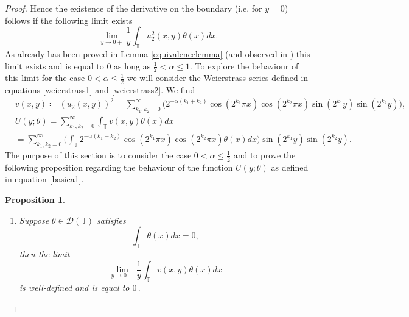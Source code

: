 \documentclass[12pt,a4paper]{article}
\newtheorem{proposition}[theorem]{Proposition}
\theoremstyle{definition}
\theoremstyle{remark}
\numberwithin{equation}{section}
\begin{document}
\begin{proof}
Hence the existence of the derivative on the boundary (i.e. for $y=0$) follows if the following limit exists
$$
\lim_{y\rightarrow 0 +} \frac1{y}  \int_{\mathbb{T}} u_2^2 (x,y) \theta (x)dx.
$$
As already has been proved in Lemma \ref{equivalencelemma} (and observed in \cite{bardos2021}) this limit exists and is equal to $0$ as long as $\frac12<\alpha \leq 1$. 
To explore the behaviour of this limit for the case $0<\alpha \le \frac12$ we will consider the Weierstrass series defined in equations \eqref{weierstrass1} and \eqref{weierstrass2}. We find
\begingroup
\allowdisplaybreaks
\begin{equation}\label{basica1}
\begin{aligned}
&v(x,y) \coloneqq (u_2(x,y))^2= \sum_{k_1, k_2=0}^\infty \bigg( 2^{-\alpha (k_1 + k_2)} \cos(2^{k_1} \pi x)  \cos(2^{k_2}\pi  x)  \sin(2^{k_1}y)  \sin(2^{k_2} y)\bigg), \\
&U(y;\theta) =  \sum_{k_1, k_2=0}^\infty \int_{\mathbb{T}} v (x,y) \theta (x)dx \\
&= \sum_{k_1, k_2=0}^\infty \bigg( \int_{\mathbb{T}} 2^{-\alpha (k_1 + k_2)} \cos(2^{k_1}  \pi x)  \cos(2^{k_2}\pi  x)\theta (x) dx\bigg)  \sin(2^{k_1}y)  \sin(2^{k_2} y) .
\end{aligned}
\end{equation}
\endgroup
The purpose of this section is to consider the case {\bf $0<\alpha \le \frac12$} and to prove the following proposition regarding the behaviour of the function  $U(y;\theta)$ as defined in equation \eqref{basica1}.
\begin{proposition}\label{th1}
$$\,$$
\begin{enumerate}
\item Suppose $\theta \in \mathcal D({\mathbb{T}})$ satisfies
\begin{equation}
\int_{\mathbb{T}} \theta(x) dx =0,
\end{equation}
then the limit
$$
\lim_{y\rightarrow 0 +} \frac1{y}  \int_{\mathbb{T}} v (x,y) \theta (x)dx
$$
is well-defined and is equal to $0\,.$


\end{enumerate}
\end{proposition}
\end{proof}
\end{document}
